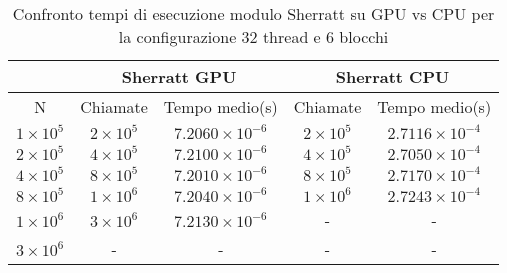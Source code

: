 \begin{table}[ht!]
    \begin{center}
        \renewcommand{\arraystretch}{1.5}
        \begin{adjustbox}{width=.65\textwidth}
            \begin{tabular}{ |c|c|c|c|c| }
                \hline
                \multicolumn{1}{|c}{} & \multicolumn{2}{|c}{Sherratt GPU} & \multicolumn{2}{|c|}{Sherratt CPU} \\
                \hline
                N & Chiamate & Tempo medio(s) & Chiamate & Tempo medio(s)\\
                \hline 
                 $1 \times 10^5$ & $2 \times 10^{5}$ & $7.2060 \times 10^{-6}$  & $2 \times 10^{5}$ & $2.7116 \times 10^{-4}$ \\ 
                \hline 
                 $2 \times 10^5$ & $4 \times 10^{5}$ & $7.2100 \times 10^{-6}$  & $4 \times 10^{5}$ & $2.7050 \times 10^{-4}$ \\ 
                \hline
                 $4 \times 10^5$ & $8 \times 10^{5}$ & $7.2010 \times 10^{-6}$  & $8 \times 10^{5}$ & $2.7170 \times 10^{-4}$ \\ 
                \hline 
                 $8 \times 10^5$ & $1 \times 10^{6}$ & $7.2040 \times 10^{-6}$  & $1 \times 10^{6}$ & $2.7243 \times 10^{-4}$ \\ 
                \hline 
                 $1 \times 10^6$ & $3 \times 10^{6}$ & $7.2130 \times 10^{-6}$  & - & - \\ 
                \hline 
                 $3 \times 10^6$ & - & - & - & - \\ 
                \hline 
            \end{tabular}
        \end{adjustbox}
    \end{center}
    \caption{Confronto tempi di esecuzione modulo Sherratt su GPU vs CPU per la configurazione 32 thread e 6 blocchi}
    \label{tab:sherratt_kernel_table_32x6}
\end{table}


